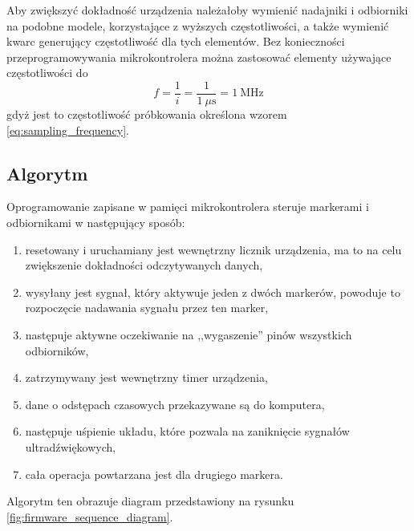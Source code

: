 Aby zwiększyć dokładność urządzenia należałoby wymienić nadajniki i odbiorniki na podobne modele, korzystające z wyższych częstotliwości, a także wymienić kwarc generujący częstotliwość dla tych elementów. Bez konieczności przeprogramowywania mikrokontrolera można zastosować elementy używające częstotliwości do
\begin{equation}
 f = \frac{1}{i} = \frac{1}{1~\mu\textrm{s}} = 1~\textrm{MHz}
\end{equation}
gdyż jest to częstotliwość próbkowania określona wzorem \ref{eq:sampling_frequency}.

\subsection{Algorytm}
Oprogramowanie zapisane w pamięci mikrokontrolera steruje markerami i odbiornikami w następujący sposób:
\begin{enumerate}
 \item resetowany i uruchamiany jest wewnętrzny licznik urządzenia, ma to na celu zwiększenie dokładności odczytywanych danych,
 \item wysyłany jest sygnał, który aktywuje jeden z dwóch markerów, powoduje to rozpoczęcie nadawania sygnału przez ten marker,
 \item następuje aktywne oczekiwanie na ,,wygaszenie'' pinów wszystkich odbiorników,
 \item zatrzymywany jest wewnętrzny timer urządzenia,
 \item dane o odstępach czasowych przekazywane są do komputera,
 \item następuje uśpienie układu, które pozwala na zaniknięcie sygnałów ultradźwiękowych,
 \item cała operacja powtarzana jest dla drugiego markera.
\end{enumerate}
Algorytm ten obrazuje diagram przedstawiony na rysunku \ref{fig:firmware_sequence_diagram}.

